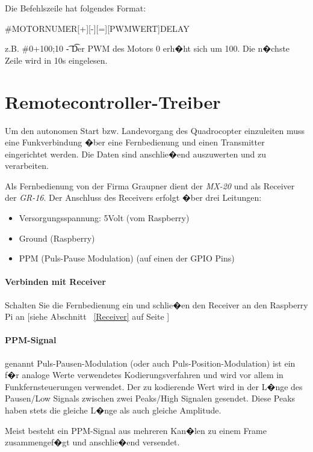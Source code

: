 Die Befehlszeile hat folgendes Format:
\newline
\begin{center}
\#MOTORNUMER[+][-][=][PWMWERT]\;DELAY
\end{center}
z.B.
\#0+100;10 \t - \t Der PWM des Motors 0 erh�ht sich um 100. Die n�chste Zeile wird in 10s eingelesen.

\newpage
\section{Remotecontroller-Treiber}
\label{Controller Treiber}

Um den autonomen Start bzw. Landevorgang des Quadrocopter einzuleiten muss eine Funkverbindung �ber eine Fernbedienung und einen Transmitter eingerichtet werden. Die Daten sind anschlie�end auszuwerten und zu verarbeiten.

Als Fernbedienung von der Firma Graupner dient der \emph{MX-20} und als Receiver der \emph{GR-16}. Der Anschluss des Receivers erfolgt �ber drei Leitungen:
\begin{itemize} 
	\item  Versorgungsspannung:  5Volt (vom Raspberry) 
	\item  Ground (Raspberry)
	\item PPM (Puls-Pause Modulation) (auf einen der GPIO Pins)
\end{itemize}


\paragraph{Verbinden mit Receiver}
Schalten Sie die Fernbedienung ein und schlie�en den Receiver an den Raspberry Pi an [siehe Abschnitt~ \ref{Receiver} auf Seite \pageref{Receiver}]

\paragraph{PPM-Signal} genannt Puls-Pausen-Modulation (oder auch Puls-Position-Modulation) ist ein f�r analoge Werte verwendetes Kodierungsverfahren und wird vor allem in Funkfernsteuerungen verwendet. Der zu kodierende Wert wird in der L�nge des Pausen/Low Signals zwischen zwei Peaks/High Signalen gesendet. Diese Peaks haben stets die gleiche L�nge als auch gleiche Amplitude.\cite{doc:ppm}

Meist besteht ein PPM-Signal aus mehreren Kan�len zu einem Frame zusammengef�gt und  anschlie�end versendet.

